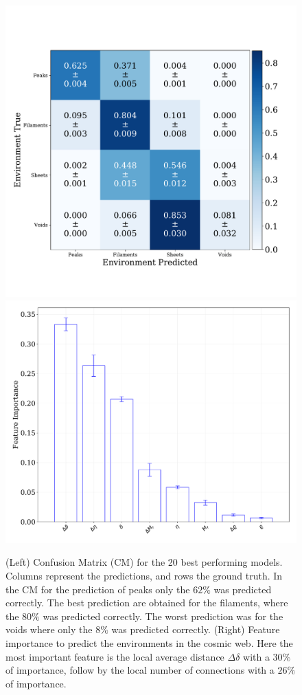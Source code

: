 \documentclass[usenatbib]{mnras}
\begin{document}
\begin{figure}
\centering
    \includegraphics[scale=0.32]{Figs/p_confusion_matrix_20.pdf}
    \includegraphics[scale=0.28]{Figs/p_features_importance_20.pdf}  
    \caption{(Left) Confusion Matrix (CM) for the 20 best performing
      models. Columns represent the predictions, and rows the ground
      truth. In the CM for the prediction of peaks only the $62\%$ was predicted correctly. The best prediction are obtained for the
      filaments, where the $80\%$ was predicted correctly. The worst  prediction was for the voids where only the $8\%$ was predicted
      correctly.
      (Right) Feature importance to predict the environments in the cosmic web. Here the most important feature is the local average distance $\Delta\delta$ with a $30\%$ of importance, follow by the local number of connections with a $26\%$ of importance.} 
    \label{fig:confusion_matrix}
\end{figure}
\end{document}

